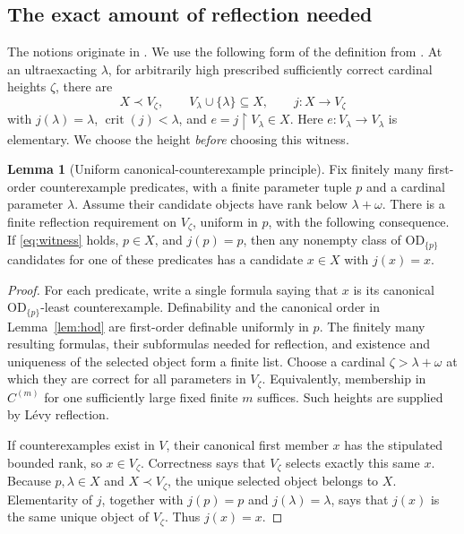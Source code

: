 \documentclass[11pt,letterpaper]{article}
\theoremstyle{definition}
\newtheorem{lemma}[definition]{Lemma}
\numberwithin{equation}{section}
\newcommand{\OD}{\mathrm{OD}}
\newcommand{\crit}{\operatorname{crit}}
\newcommand{\restr}{\mathbin{\upharpoonright}}
\newcommand{\ODp}{\OD_{\{p\}}}
\begin{document}
\subsection{The exact amount of reflection needed}

The notions originate in \cite{abl}. We use the following form of the
definition from \cite[Section~2]{abgl}. At an ultraexacting $\lambda$, for arbitrarily
high prescribed sufficiently correct cardinal heights $\zeta$, there
are
\begin{equation}\label{eq:witness}
 X\prec V_\zeta,\qquad V_\lambda\cup\{\lambda\}\subseteq X,
 \qquad j:X\longrightarrow V_\zeta
\end{equation}
with $j(\lambda)=\lambda$, $\crit(j)<\lambda$, and
$e=j\restr V_\lambda\in X$. Here $e:V_\lambda\to V_\lambda$ is
elementary. We choose the height \emph{before} choosing this witness.

\begin{lemma}[Uniform canonical-counterexample principle]\label{lem:least}
Fix finitely many first-order counterexample predicates, with a finite
parameter tuple $p$ and a cardinal parameter $\lambda$. Assume their
candidate objects have rank below $\lambda+\omega$. There is a finite
reflection requirement on $V_\zeta$, uniform in $p$, with the following
consequence. If \eqref{eq:witness} holds, $p\in X$, and $j(p)=p$, then
any nonempty class of $\ODp$ candidates for one of these predicates has
a candidate $x\in X$ with $j(x)=x$.
\end{lemma}

\begin{proof}
For each predicate, write a single formula saying that $x$ is its
canonical $\ODp$-least counterexample. Definability and the canonical
order in Lemma~\ref{lem:hod} are first-order definable uniformly in
$p$. The finitely many resulting formulas, their subformulas needed for
reflection, and existence and uniqueness of the selected object form a
finite list. Choose a cardinal $\zeta>\lambda+\omega$ at which they are
correct for all parameters in $V_\zeta$. Equivalently, membership in
$C^{(m)}$ for one sufficiently large fixed finite $m$ suffices. Such
heights are supplied by L\'evy reflection.

If counterexamples exist in $V$, their canonical first member $x$ has
the stipulated bounded rank, so $x\in V_\zeta$. Correctness says that
$V_\zeta$ selects exactly this same $x$. Because $p,\lambda\in X$ and
$X\prec V_\zeta$, the unique selected object belongs to $X$.
Elementarity of $j$, together with $j(p)=p$ and $j(\lambda)=\lambda$,
says that $j(x)$ is the same unique object of $V_\zeta$. Thus $j(x)=x$.
\end{proof}
\end{document}
